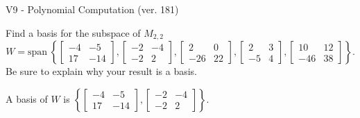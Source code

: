 \begin{exercise}
  \begin{exerciseTitle}V9 - Polynomial Computation (ver. 181)\end{exerciseTitle}
  \begin{exerciseStatement}
    Find a basis for the subspace of \(M_{2,2}\) 
\[W=\mathrm{span}\ \left\{\left[\begin{array}{cc}
-4 & -5 \\
17 & -14
\end{array}\right] , \left[\begin{array}{cc}
-2 & -4 \\
-2 & 2
\end{array}\right] , \left[\begin{array}{cc}
2 & 0 \\
-26 & 22
\end{array}\right] , \left[\begin{array}{cc}
2 & 3 \\
-5 & 4
\end{array}\right] , \left[\begin{array}{cc}
10 & 12 \\
-46 & 38
\end{array}\right]\right\}.\]
 Be sure to explain why your result is a basis.


  \end{exerciseStatement}
  \begin{exerciseAnswer}
   A basis of \(W\) is  \(\left\{\left[\begin{array}{cc}
-4 & -5 \\
17 & -14
\end{array}\right] , \left[\begin{array}{cc}
-2 & -4 \\
-2 & 2
\end{array}\right]\right\}\).
  


  \end{exerciseAnswer}
\end{exercise}